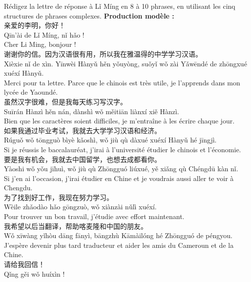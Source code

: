 \documentclass[11pt]{article}
\begin{document}
\begin{exoresolu}
Rédigez la lettre de réponse à Lǐ Míng en 8 à 10 phrases, en utilisant les cinq structures de phrases complexes.
\tcblower
\textbf{Production modèle :}\\[4pt]
亲爱的李明，你好！\\
Qīn'ài de Lǐ Míng, nǐ hǎo !\\
Cher Li Ming, bonjour !\\[3pt]
谢谢你的信。因为汉语很有用，所以我在雅温得的中学学习汉语。\\
Xièxie nǐ de xìn. Yīnwèi Hànyǔ hěn yǒuyòng, suǒyǐ wǒ zài Yǎwēndé de zhōngxué xuéxí Hànyǔ.\\
Merci pour ta lettre. Parce que le chinois est très utile, je l'apprends dans mon lycée de Yaoundé.\\[3pt]
虽然汉字很难，但是我每天练习写汉字。\\
Suīrán Hànzì hěn nán, dànshì wǒ měitiān liànxí xiě Hànzì.\\
Bien que les caractères soient difficiles, je m'entraîne à les écrire chaque jour.\\[3pt]
如果我通过毕业考试，我就去大学学习汉语和经济。\\
Rúguǒ wǒ tōngguò bìyè kǎoshì, wǒ jiù qù dàxué xuéxí Hànyǔ hé jīngjì.\\
Si je réussis le baccalauréat, j'irai à l'université étudier le chinois et l'économie.\\[3pt]
要是我有机会，我就去中国留学，也想去成都看你。\\
Yàoshi wǒ yǒu jīhuì, wǒ jiù qù Zhōngguó liúxué, yě xiǎng qù Chéngdū kàn nǐ.\\
Si j'en ai l'occasion, j'irai étudier en Chine et je voudrais aussi aller te voir à Chengdu.\\[3pt]
为了找到好工作，我现在努力学习。\\
Wèile zhǎodào hǎo gōngzuò, wǒ xiànzài nǔlì xuéxí.\\
Pour trouver un bon travail, j'étudie avec effort maintenant.\\[3pt]
我希望以后当翻译，帮助喀麦隆和中国的朋友。\\
Wǒ xīwàng yǐhòu dāng fānyì, bāngzhù Kāmàilóng hé Zhōngguó de péngyou.\\
J'espère devenir plus tard traducteur et aider les amis du Cameroun et de la Chine.\\[3pt]
请给我回信！\\
Qǐng gěi wǒ huíxìn !\\

\end{exoresolu}
\end{document}
